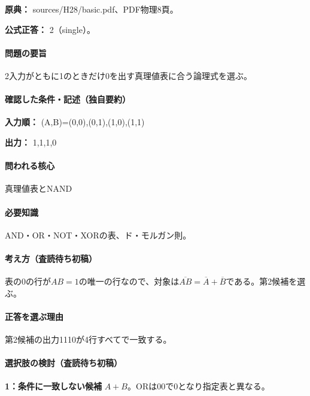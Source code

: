 \noindent\textbf{原典：} sources/H28/basic.pdf、PDF物理8頁。

\textbf{公式正答：} 2（single）。

\paragraph{問題の要旨} 2入力がともに1のときだけ0を出す真理値表に合う論理式を選ぶ。

\paragraph{確認した条件・記述（独自要約）}\mbox{}\par

\noindent\textbf{入力順：} (A,B)=\allowbreak{}(0,0),(0,1),(1,0),(1,1)\par

\noindent\textbf{出力：} 1,1,1,0\par

\paragraph{問われる核心} 真理値表とNAND

\paragraph{必要知識} AND・OR・NOT・XORの表、ド・モルガン則。

\paragraph{考え方（査読待ち初稿）} 表の0の行が\(AB=1\)の唯一の行なので、対象は\(\overline{AB}=\overline A+\overline B\)である。第2候補を選ぶ。

\paragraph{正答を選ぶ理由} 第2候補の出力1110が4行すべてで一致する。

\paragraph{選択肢の検討（査読待ち初稿）}\mbox{}\par

\noindent\textbf{1：条件に一致しない候補} \(A+B\)。ORは00で0となり指定表と異なる。\par

